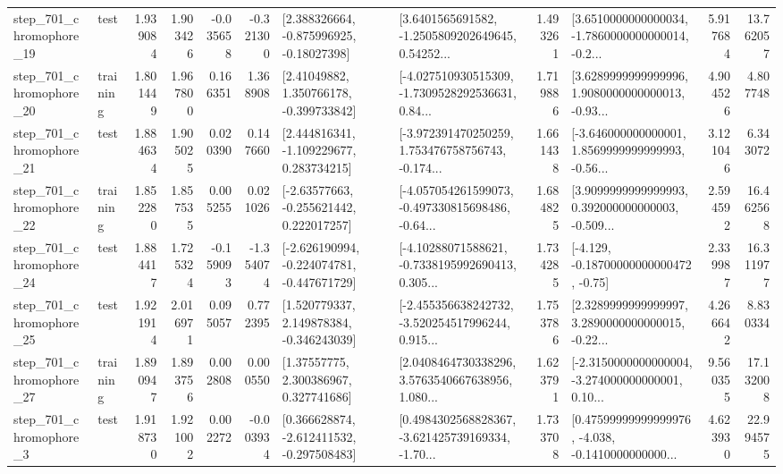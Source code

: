 \begin{tabular}{llrrrrllrlrr}
  step\_701\_chromophore\_19 &      test &      1.939084 &    1.903426 &     -0.035658 & -0.321300 &    [2.388326664, -0.875996925, -0.18027398] &  [3.6401565691582, -1.2505809202649645, 0.54252... &       1.493261 &  [3.6510000000000034, -1.7860000000000014, -0.2... &            5.917684 &         13.762057 \\
  step\_701\_chromophore\_20 &  training &      1.801449 &    1.967800 &      0.166351 &  1.368908 &     [2.41049882, 1.350766178, -0.399733842] &  [-4.027510930515309, -1.7309528292536631, 0.84... &       1.719886 &  [3.6289999999999996, 1.9080000000000013, -0.93... &            4.904526 &          4.807748 \\
  step\_701\_chromophore\_21 &      test &      1.884634 &    1.905025 &      0.020390 &  0.147660 &    [2.444816341, -1.109229677, 0.283734215] &  [-3.972391470250259, 1.753476758756743, -0.174... &       1.661438 &  [-3.646000000000001, 1.8569999999999993, -0.56... &            3.121046 &          6.343072 \\
  step\_701\_chromophore\_22 &  training &      1.852280 &    1.857535 &      0.005255 &  0.021026 &    [-2.63577663, -0.255621442, 0.222017257] &  [-4.057054261599073, -0.497330815698486, -0.64... &       1.684825 &  [3.9099999999999993, 0.392000000000003, -0.509... &            2.594592 &         16.462568 \\
  step\_701\_chromophore\_24 &      test &      1.884417 &    1.725324 &     -0.159093 & -1.354074 &  [-2.626190994, -0.224074781, -0.447671729] &  [-4.10288071588621, -0.7338195992690413, 0.305... &       1.734285 &              [-4.129, -0.18700000000000472, -0.75] &            2.339987 &         16.311977 \\
  step\_701\_chromophore\_25 &      test &      1.921914 &    2.016971 &      0.095057 &  0.772395 &    [1.520779337, 2.149878384, -0.346243039] &  [-2.455356638242732, -3.520254517996244, 0.915... &       1.753786 &  [2.3289999999999997, 3.2890000000000015, -0.22... &            4.266642 &          8.830334 \\
  step\_701\_chromophore\_27 &  training &      1.890947 &    1.893756 &      0.002808 &  0.000550 &      [1.37557775, 2.300386967, 0.327741686] &  [2.0408464730338296, 3.5763540667638956, 1.080... &       1.623791 &  [-2.3150000000000004, -3.274000000000001, 0.10... &            9.560355 &         17.132008 \\
   step\_701\_chromophore\_3 &      test &      1.918730 &    1.921002 &      0.002272 & -0.003934 &   [0.366628874, -2.612411532, -0.297508483] &  [0.4984302568828367, -3.621425739169334, -1.70... &       1.733708 &  [0.47599999999999976, -4.038, -0.1410000000000... &            4.623930 &         22.994575 \\

\end{tabular}
